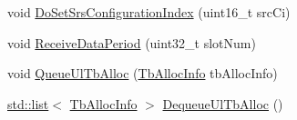 \begin{DoxyCompactItemize}
void \hyperlink{classns3_1_1MmWaveUePhy_a743b1dd30923e90a9ef9a8a62d5850af}{Do\+Set\+Srs\+Configuration\+Index} (uint16\+\_\+t src\+Ci)
\item 
void \hyperlink{classns3_1_1MmWaveUePhy_a9dbe0eb8d7012a654e5396888fc2d6f5}{Receive\+Data\+Period} (uint32\+\_\+t slot\+Num)
\item 
void \hyperlink{classns3_1_1MmWaveUePhy_a9370a8aaac6c565140c7b37a0340cdcf}{Queue\+Ul\+Tb\+Alloc} (\hyperlink{structns3_1_1TbAllocInfo}{Tb\+Alloc\+Info} tb\+Alloc\+Info)
\item 
\hyperlink{openflow-interface_8h_afd9bcfa176617760671b67580f536fa7}{std\+::list}$<$ \hyperlink{structns3_1_1TbAllocInfo}{Tb\+Alloc\+Info} $>$ \hyperlink{classns3_1_1MmWaveUePhy_a65fc2652ed184536363bf496ea15715b}{Dequeue\+Ul\+Tb\+Alloc} ()
\end{DoxyCompactItemize}
